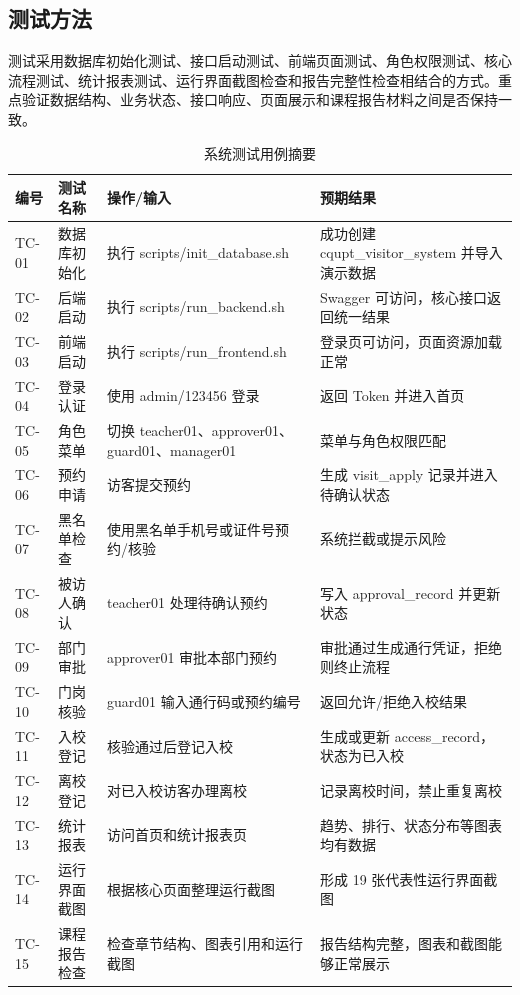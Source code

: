 \subsection{测试方法}
测试采用数据库初始化测试、接口启动测试、前端页面测试、角色权限测试、核心流程测试、统计报表测试、运行界面截图检查和报告完整性检查相结合的方式。重点验证数据结构、业务状态、接口响应、页面展示和课程报告材料之间是否保持一致。
\begin{longtable}{>{\raggedright\arraybackslash}p{}>{\raggedright\arraybackslash}p{}>{\raggedright\arraybackslash}p{}>{\raggedright\arraybackslash}p{}}
\caption{系统测试用例摘要}\\
\toprule
编号 & 测试名称 & 操作/输入 & 预期结果 \\
\midrule
TC-01 & 数据库初始化 & 执行 scripts/init\_database.sh & 成功创建 cqupt\_visitor\_system 并导入演示数据 \\
TC-02 & 后端启动 & 执行 scripts/run\_backend.sh & Swagger 可访问，核心接口返回统一结果 \\
TC-03 & 前端启动 & 执行 scripts/run\_frontend.sh & 登录页可访问，页面资源加载正常 \\
TC-04 & 登录认证 & 使用 admin/123456 登录 & 返回 Token 并进入首页 \\
TC-05 & 角色菜单 & 切换 teacher01、approver01、guard01、manager01 & 菜单与角色权限匹配 \\
TC-06 & 预约申请 & 访客提交预约 & 生成 visit\_apply 记录并进入待确认状态 \\
TC-07 & 黑名单检查 & 使用黑名单手机号或证件号预约/核验 & 系统拦截或提示风险 \\
TC-08 & 被访人确认 & teacher01 处理待确认预约 & 写入 approval\_record 并更新状态 \\
TC-09 & 部门审批 & approver01 审批本部门预约 & 审批通过生成通行凭证，拒绝则终止流程 \\
TC-10 & 门岗核验 & guard01 输入通行码或预约编号 & 返回允许/拒绝入校结果 \\
TC-11 & 入校登记 & 核验通过后登记入校 & 生成或更新 access\_record，状态为已入校 \\
TC-12 & 离校登记 & 对已入校访客办理离校 & 记录离校时间，禁止重复离校 \\
TC-13 & 统计报表 & 访问首页和统计报表页 & 趋势、排行、状态分布等图表均有数据 \\
TC-14 & 运行界面截图 & 根据核心页面整理运行截图 & 形成 19 张代表性运行界面截图 \\
TC-15 & 课程报告检查 & 检查章节结构、图表引用和运行截图 & 报告结构完整，图表和截图能够正常展示 \\
\bottomrule
\end{longtable}
